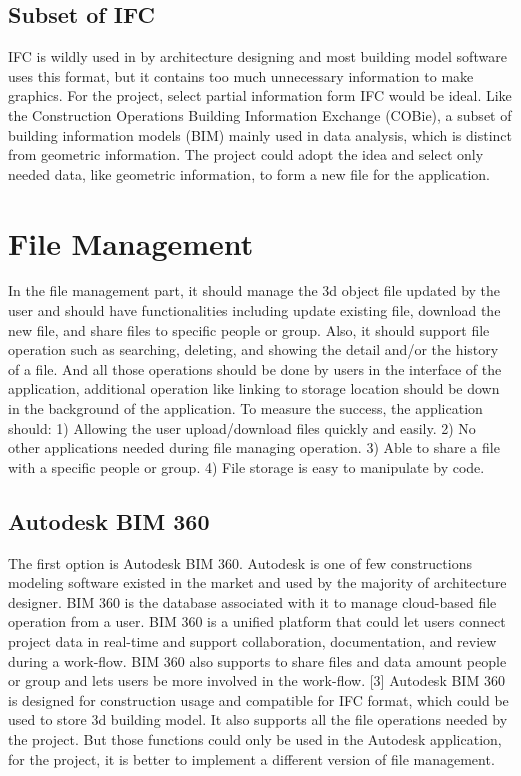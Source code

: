 \documentclass[10pt,letter paper]{article}
\begin{document}
\subsection{Subset of IFC}
IFC is wildly used in by architecture designing and most building model software uses this format, but it contains too much unnecessary information to make graphics. For the project, select partial information form IFC would be ideal. Like the Construction Operations Building Information Exchange (COBie), a subset of building information models (BIM) mainly used in data analysis, which is distinct from geometric information. The project could adopt the idea and select only needed data, like geometric information, to form a new file for the application.

\section{File Management}
In the file management part, it should manage the 3d object file updated by the user and should have functionalities including update existing file, download the new file, and share files to specific people or group. Also, it should support file operation such as searching, deleting, and showing the detail and/or the history of a file. And all those operations should be done by users in the interface of the application, additional operation like linking to storage location should be down in the background of the application.\newline
\noindent
\newline
To measure the success, the application should: 1) Allowing the user upload/download files quickly and easily. 2) No other applications needed during file managing operation. 3) Able to share a file with a specific people or group. 4) File storage is easy to manipulate by code.

\subsection{Autodesk BIM 360}
The first option is Autodesk BIM 360. Autodesk is one of few constructions modeling software existed in the market and used by the majority of architecture designer. BIM 360 is the database associated with it to manage cloud-based file operation from a user. BIM 360 is a unified platform that could let users connect project data in real-time and support collaboration, documentation, and review during a work-flow. BIM 360 also supports to share files and data amount people or group and lets users be more involved in the work-flow. [3]\newline
\noindent
\newline
Autodesk BIM 360 is designed for construction usage and compatible for IFC format, which could be used to
store 3d building model. It also supports all the file operations needed by the project. But those functions could only be used in the Autodesk application, for the project, it is better to implement a different version of file management.
\end{document}
